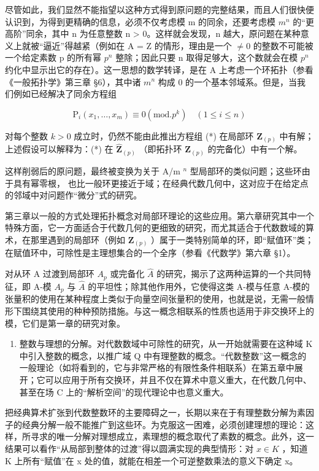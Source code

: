 尽管如此，我们显然不能指望以这种方式得到原问题的完整结果，而且人们很快便认识到，为得到更精确的信息，必须不仅考虑模 m 的同余，还要考虑模 \(m^{n}\) 的“更高阶”同余，其中 n 为任意整数 n \textgreater{} 0。这样就会发现，n 越大，原问题在某种意义上就被“逼近”得越紧（例如在 A = Z 的情形，理由是一个 \(\neq 0\) 的整数不可能被一个给定素数 p 的所有幂 \(p^{n}\) 整除；因此只要 n 取得足够大，这个数就会在模 \(p^{n}\) 约化中显示出它的存在）。这一思想的数学转译，是在 A 上考虑一个环拓扑（参看《一般拓扑学》第三章 §6），其中诸 \(m^{n}\) 构成 0 的一个基本邻域系。但是，当我们例如已经解决了同余方程组

\[
\mathrm{P} _ {i} (x _ {1}, \dots , x _ {m}) \equiv 0 (\mathrm{mod.} p ^ {k}) \quad (1 \leqslant i \leqslant n)\tag{**}
\]

对每个整数 \(k > 0\) 成立时，仍然不能由此推出方程组 (*) 在局部环 \(\mathbf{Z}_{(p)}\) 中有解；上述假设可以解释为：(*) 在 \(\hat{\mathbf{Z}}_{(p)}\) （即拓扑环 \(\mathbf{Z}_{(p)}\) 的完备化）中有一个解。

这样削弱后的原问题，最终被变换为关于 A/m \(^{n}\) 型局部环的类似问题；这些环由于具有幂零根，
也比一般环更接近于域；在经典代数几何中，这对应于在给定点的邻域中对问题作“微分”式的研究。

第三章以一般的方式处理拓扑概念对局部环理论的这些应用。第六章研究其中一个特殊方面，它一方面适合于代数几何的更细致的研究，而尤其适合于代数数域的算术，在那里遇到的局部环（例如 \(\mathbf{Z}_{(p)}\) ）属于一类特别简单的环，即“赋值环”类；在赋值环中，可除性是主理想集合的一个全序（参看《代数学》第六章 §1）。

对从环 A 过渡到局部环 \(A_{p}\) 或完备化 \(\hat{A}\) 的研究，揭示了这两种运算的一个共同特征，即 A-模 \(A_{p}\) 与 \(\hat{A}\) 的平坦性；除其他作用外，它使得这类 A-模与任意 A-模的张量积的使用在某种程度上类似于向量空间张量积的使用，也就是说，无需一般情形下围绕其使用的种种预防措施。与这一概念相联系的性质也适用于非交换环上的模，它们是第一章的研究对象。

\begin{enumerate}
\def\labelenumi{\Roman{enumi}.}
\setcounter{enumi}{2}
\tightlist
\item
  整数与理想的分解。对代数数域中可除性的研究，从一开始就需要在这种域 K 中引入整数的概念，以推广域 Q 中有理整数的概念。“代数整数”这一概念的一般理论（如将看到的，它与非常严格的有限性条件相联系）在第五章中展开；它可以应用于所有交换环，并且不仅在算术中意义重大，在代数几何中、甚至在场 C 上的“解析空间”的现代理论中也意义重大。
\end{enumerate}

把经典算术扩张到代数整数环的主要障碍之一，长期以来在于有理整数分解为素因子的经典分解一般不能推广到这些环。为克服这一困难，必须创建理想的理论：这样，所寻求的唯一分解对理想成立，素理想的概念取代了素数的概念。此外，这一结果可以看作“从局部到整体的过渡”得以圆满实现的典型情形：对 \(x \in K\) ，知道 K 上所有“赋值”在 x 处的值，就能在相差一个可逆整数乘法的意义下确定 x。

